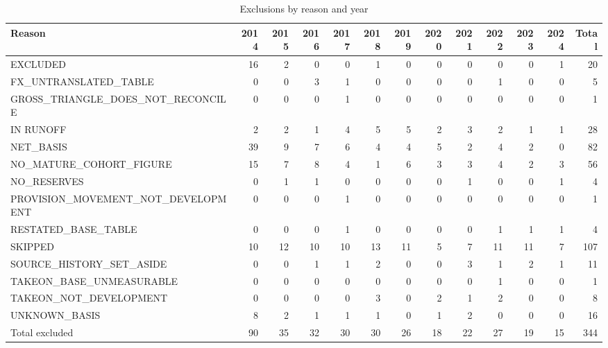 \begin{table}[htbp]
\centering
\caption{Exclusions by reason and year}
\label{tab:exclusions_by_year}
\begin{tabular}{lrrrrrrrrrrrr}
\toprule
\textbf{Reason} & \textbf{2014} & \textbf{2015} & \textbf{2016} & \textbf{2017} & \textbf{2018} & \textbf{2019} & \textbf{2020} & \textbf{2021} & \textbf{2022} & \textbf{2023} & \textbf{2024} & \textbf{Total} \\
\midrule
EXCLUDED & 16 & 2 & 0 & 0 & 1 & 0 & 0 & 0 & 0 & 0 & 1 & 20 \\
FX_UNTRANSLATED_TABLE & 0 & 0 & 3 & 1 & 0 & 0 & 0 & 0 & 1 & 0 & 0 & 5 \\
GROSS_TRIANGLE_DOES_NOT_RECONCILE & 0 & 0 & 0 & 1 & 0 & 0 & 0 & 0 & 0 & 0 & 0 & 1 \\
IN RUNOFF & 2 & 2 & 1 & 4 & 5 & 5 & 2 & 3 & 2 & 1 & 1 & 28 \\
NET_BASIS & 39 & 9 & 7 & 6 & 4 & 4 & 5 & 2 & 4 & 2 & 0 & 82 \\
NO_MATURE_COHORT_FIGURE & 15 & 7 & 8 & 4 & 1 & 6 & 3 & 3 & 4 & 2 & 3 & 56 \\
NO_RESERVES & 0 & 1 & 1 & 0 & 0 & 0 & 0 & 1 & 0 & 0 & 1 & 4 \\
PROVISION_MOVEMENT_NOT_DEVELOPMENT & 0 & 0 & 0 & 1 & 0 & 0 & 0 & 0 & 0 & 0 & 0 & 1 \\
RESTATED_BASE_TABLE & 0 & 0 & 0 & 1 & 0 & 0 & 0 & 0 & 1 & 1 & 1 & 4 \\
SKIPPED & 10 & 12 & 10 & 10 & 13 & 11 & 5 & 7 & 11 & 11 & 7 & 107 \\
SOURCE_HISTORY_SET_ASIDE & 0 & 0 & 1 & 1 & 2 & 0 & 0 & 3 & 1 & 2 & 1 & 11 \\
TAKEON_BASE_UNMEASURABLE & 0 & 0 & 0 & 0 & 0 & 0 & 0 & 0 & 1 & 0 & 0 & 1 \\
TAKEON_NOT_DEVELOPMENT & 0 & 0 & 0 & 0 & 3 & 0 & 2 & 1 & 2 & 0 & 0 & 8 \\
UNKNOWN_BASIS & 8 & 2 & 1 & 1 & 1 & 0 & 1 & 2 & 0 & 0 & 0 & 16 \\
\midrule
Total excluded & 90 & 35 & 32 & 30 & 30 & 26 & 18 & 22 & 27 & 19 & 15 & 344 \\
\bottomrule
\end{tabular}
\end{table}
